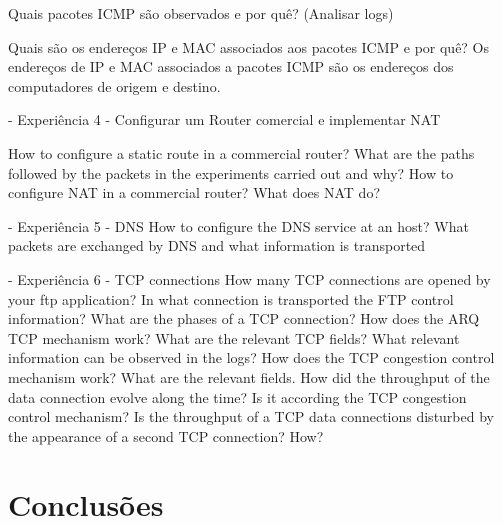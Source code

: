\documentclass[article, a4paper, 11pt, oneside]{memoir}
\begin{document}
Quais pacotes ICMP são observados e por quê?
(Analisar logs)

Quais são os endereços IP e MAC associados aos pacotes ICMP e por quê?
Os endereços de IP e MAC associados a pacotes ICMP são os endereços dos computadores de origem e destino.

- Experiência 4 - Configurar um Router comercial e implementar NAT

How to configure a static route in a commercial router?
What are the paths followed by the packets in the experiments carried out and why?
How to configure NAT in a commercial router?
What does NAT do?

- Experiência 5 - DNS
How to configure the DNS service at an host?
What packets are exchanged by DNS and what information is transported

- Experiência 6 - TCP connections
How many TCP connections are opened by your ftp application?
In what connection is transported the FTP control information?
What are the phases of a TCP connection?
How does the ARQ TCP mechanism work? What are the relevant TCP fields? What relevant information can be observed in the logs?
How does the TCP congestion control mechanism work? What are the relevant fields. How did the throughput of the data connection evolve along  the time? Is it according the TCP congestion control mechanism?
Is the throughput of a TCP data connections disturbed by the appearance of a second TCP connection? How?


\chapter[Conclusões][Conclusões]{Conclusões} \label{\thechapter}
\end{document}
